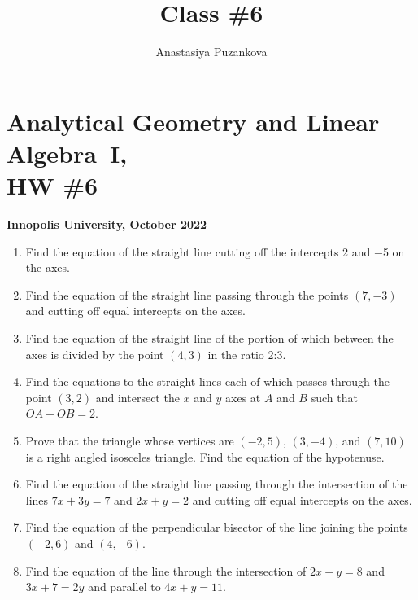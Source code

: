 \documentclass[a4paper,10pt]{article}
\title{Class \#6}
\author{Anastasiya Puzankova}
\date{}
\begin{document}
\section*{Analytical Geometry and Linear Algebra~I, \\ HW \#6}
\noindent\textbf{Innopolis University, October 2022}
\\

\begin{enumerate}
\item
Find the equation of the straight line cutting off the intercepts 2 and −5 on the axes.

\item
Find the equation of the straight line passing through the points $(7, −3)$ and cutting off equal intercepts on the axes.

\item
Find the equation of the straight line of the portion of which between the axes is divided by the point $(4, 3)$ in the ratio 2:3.

\item
Find the equations to the straight lines each of which passes through the point $(3, 2)$ and intersect the $x$ and $y$ axes at $A$ and $B$ such that $OA - OB = 2$.

\item
Prove that the triangle whose vertices are $(−2, 5)$, $(3, −4)$, and $(7, 10)$ is a right angled isosceles triangle. Find the equation of the hypotenuse.

\item
Find the equation of the straight line passing through the intersection of the lines $7x + 3y = 7$ and $2x + y = 2$ and cutting off equal intercepts on the axes.

\item
Find the equation of the perpendicular bisector of the line joining the points $(−2, 6)$ and $(4, −6)$.

\item
Find the equation of the line through the intersection of $2x + y = 8$ and $3x + 7 = 2y$ and parallel to $4x + y = 11$.


\end{enumerate}
\end{document}
